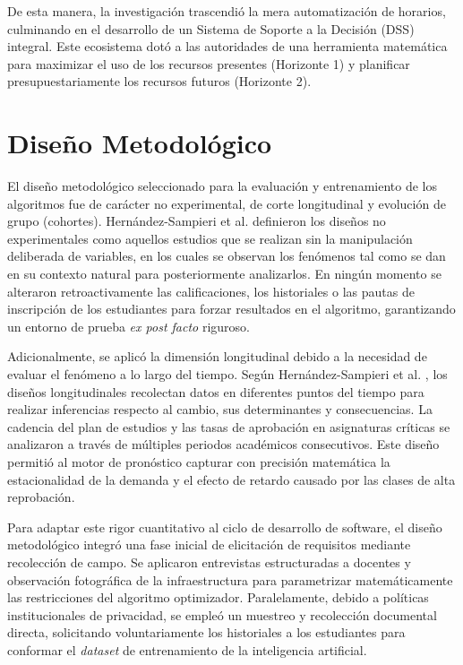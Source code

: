 De esta manera, la investigación trascendió la mera automatización de horarios, culminando en el desarrollo de un Sistema de Soporte a la Decisión (DSS) integral. Este ecosistema dotó a las autoridades de una herramienta matemática para maximizar el uso de los recursos presentes (Horizonte 1) y planificar presupuestariamente los recursos futuros (Horizonte 2).

\section{Diseño Metodológico}
El diseño metodológico seleccionado para la evaluación y entrenamiento de los algoritmos fue de carácter no experimental, de corte longitudinal y evolución de grupo (cohortes). Hernández-Sampieri et al. \cite{sampieri_metodologia_2014} definieron los diseños no experimentales como aquellos estudios que se realizan sin la manipulación deliberada de variables, en los cuales se observan los fenómenos tal como se dan en su contexto natural para posteriormente analizarlos. En ningún momento se alteraron retroactivamente las calificaciones, los historiales o las pautas de inscripción de los estudiantes para forzar resultados en el algoritmo, garantizando un entorno de prueba \textit{ex post facto} riguroso.

Adicionalmente, se aplicó la dimensión longitudinal debido a la necesidad de evaluar el fenómeno a lo largo del tiempo. Según Hernández-Sampieri et al. \cite{sampieri_metodologia_2014}, los diseños longitudinales recolectan datos en diferentes puntos del tiempo para realizar inferencias respecto al cambio, sus determinantes y consecuencias. La cadencia del plan de estudios y las tasas de aprobación en asignaturas críticas se analizaron a través de múltiples periodos académicos consecutivos. Este diseño permitió al motor de pronóstico capturar con precisión matemática la estacionalidad de la demanda y el efecto de retardo causado por las clases de alta reprobación.

Para adaptar este rigor cuantitativo al ciclo de desarrollo de software, el diseño metodológico integró una fase inicial de elicitación de requisitos mediante recolección de campo. Se aplicaron entrevistas estructuradas a docentes y observación fotográfica de la infraestructura para parametrizar matemáticamente las restricciones del algoritmo optimizador. Paralelamente, debido a políticas institucionales de privacidad, se empleó un muestreo y recolección documental directa, solicitando voluntariamente los historiales a los estudiantes para conformar el \textit{dataset} de entrenamiento de la inteligencia artificial.

